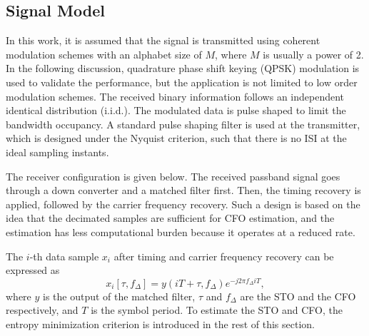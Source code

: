 \documentclass[12pt, draftclsnofoot, onecolumn]{IEEEtran}
\begin{document}
\subsection{Signal Model }  
\label{sec:model}

In this work, it is assumed that the signal is transmitted using coherent modulation schemes with an alphabet size of \(M\), where \(M\) is usually a power of 2.
In the following discussion, quadrature phase shift keying (QPSK) modulation is used to validate the performance, but the application is not limited to low order modulation schemes.
The received binary information follows an independent identical distribution (i.i.d.).
The modulated data is pulse shaped to limit the bandwidth occupancy.
A standard pulse shaping filter is used at the transmitter, which is designed under the Nyquist criterion, 
such that there is no ISI at the ideal sampling instants.


The receiver configuration is given below.
The received passband signal goes through a down converter and a matched filter first.
Then, the timing recovery is applied, followed by the carrier frequency recovery.
Such a design is based on the idea that the decimated samples are sufficient for CFO estimation, and the estimation has less computational burden because it operates at a reduced rate.

The $i$-th data sample \(x_i\) after timing and carrier frequency recovery can be expressed as \cite{Xie2012}
\begin{equation}
{x_i}[\tau, f_\Delta ] = y(iT +  \tau, f_\Delta){e^{ - j2\pi {f_\Delta }iT}},
\end{equation}
% 
% 
where \(y\) is the output of the matched filter, \(\tau\) and \(f_\Delta\) are the STO and the CFO respectively, and \(T\) is the symbol period.
To estimate the STO and CFO, the entropy minimization criterion is introduced in the rest of this section.
\end{document}

